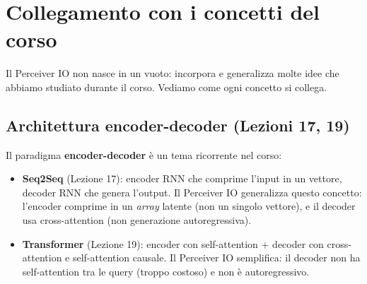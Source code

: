 \documentclass[12pt,a4paper]{article}
\begin{document}
\section{Collegamento con i concetti del corso}

Il Perceiver IO non nasce in un vuoto: incorpora e generalizza molte idee che abbiamo studiato durante il corso. Vediamo come ogni concetto si collega.

\subsection{Architettura encoder-decoder (Lezioni 17, 19)}

Il paradigma \textbf{encoder-decoder} \`e un tema ricorrente nel corso:
\begin{itemize}
    \item \textbf{Seq2Seq} (Lezione 17): encoder RNN che comprime l'input in un vettore, decoder RNN che genera l'output. Il Perceiver IO generalizza questo concetto: l'encoder comprime in un \emph{array} latente (non un singolo vettore), e il decoder usa cross-attention (non generazione autoregressiva).
    \item \textbf{Transformer} (Lezione 19): encoder con self-attention + decoder con cross-attention e self-attention causale. Il Perceiver IO semplifica: il decoder non ha self-attention tra le query (troppo costoso) e non \`e autoregressivo.
\end{itemize}
\end{document}
